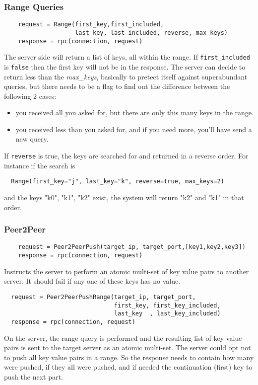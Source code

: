 \documentclass{article}
\begin{document}
\subsubsection{Range Queries}
  \begin{lstlisting}
    request = Range(first_key,first_included,
                    last_key, last_included, reverse, max_keys)
    response = rpc(connection, request)
  \end{lstlisting}
  The server side will return a list of keys, all within the range.
  If \texttt{first\_included} is \texttt{false} then the first key will not be
  in the response.
  The server can decide to return less than the \emph{max\_keys},
basically to pretect itself against superabundant queries,
but there needs to be a flag to find out the difference between
the following 2 cases:
\begin{itemize}
  \item{}you received all you asked for,
    but there are only this many keys in the range.
  \item{}you received less than you asked for,
    and if you need more, you'll have send a new query.
\end{itemize}
  If \texttt{reverse} is true,
  the keys are searched for and returned in a reverse order.
  For instance if the search is
  \begin{lstlisting}
  Range(first_key="j", last_key="k", reverse=true, max_keys=2)
  \end{lstlisting}
  and the keys "k0", "k1", "k2" exist,
  the system will return "k2" and "k1" in that order.

\subsubsection{Peer2Peer}

  \begin{lstlisting}
    request = Peer2PeerPush(target_ip, target_port,[key1,key2,key3])
    response = rpc(connection, request)
  \end{lstlisting}
Instructs the server to perform an atomic multi-set of key value pairs
to another server. It should fail if any one of these keys has no value.
\begin{lstlisting}
  request = Peer2PeerPushRange(target_ip, target_port,
                               first_key, first_key_included,
                               last_key  , last_key_included)
  response = rpc(connection, request)

\end{lstlisting}
  On the server, the range query is performed and the resulting
  list of key value pairs is sent to the target server as an atomic multi-set.
  The server could opt not to push all key value pairs in a range.
So the response needs to contain how many were pushed,
if they all were pushed, and if needed the continuation (first) key to push
the next part.
\end{document}
